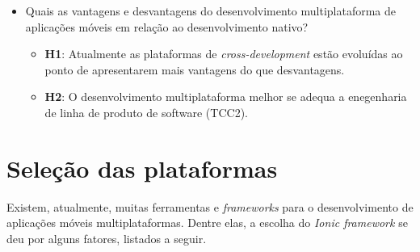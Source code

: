 \begin{itemize}
    \item Quais as vantagens e desvantagens do desenvolvimento multiplataforma de aplicações móveis em relação ao desenvolvimento nativo?
    \begin{itemize}
        \item \textbf{H1}: Atualmente as plataformas de \textit{cross-development} estão evoluídas ao ponto de apresentarem mais vantagens do que desvantagens.
        \item \textbf{H2}: O desenvolvimento multiplataforma melhor se adequa a enegenharia de linha de produto de software (TCC2).
    \end{itemize}

     
\end{itemize}

\section{Seleção das plataformas} \label{subsec:selecaodasplataformas}

Existem, atualmente, muitas ferramentas e \textit{frameworks} para o desenvolvimento de aplicações móveis multiplataformas. Dentre elas, a escolha do \textit{Ionic framework} se deu por alguns fatores, listados a seguir. 

